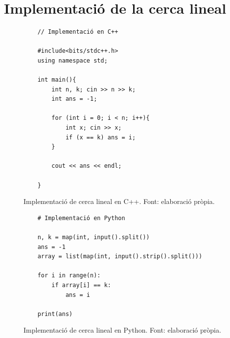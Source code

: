 \section{Implementació de la cerca lineal}
\begin{figure}[H]
    \begin{verbatim}
    // Implementació en C++
    
    #include<bits/stdc++.h>
    using namespace std;

    int main(){
    	int n, k; cin >> n >> k;
    	int ans = -1;
    	
    	for (int i = 0; i < n; i++){
    		int x; cin >> x;
    		if (x == k) ans = i;
    	}
    	
    	cout << ans << endl;
    	
    }
    \end{verbatim}
    \caption[Implementació de cerca lineal en C++.]{Implementació de cerca lineal en C++. Font: elaboració pròpia.}
    \label{Figura}
\end{figure}%
\begin{figure}[H]
    \begin{verbatim}
    # Implementació en Python
        
    n, k = map(int, input().split())
    ans = -1
    array = list(map(int, input().strip().split()))
    
    for i in range(n):
        if array[i] == k:
            ans = i
    
    print(ans)
    \end{verbatim}
    \caption[Implementació de cerca lineal en Python.]{Implementació de cerca lineal en Python. Font: elaboració pròpia.}
    \label{Figura}
\end{figure}


